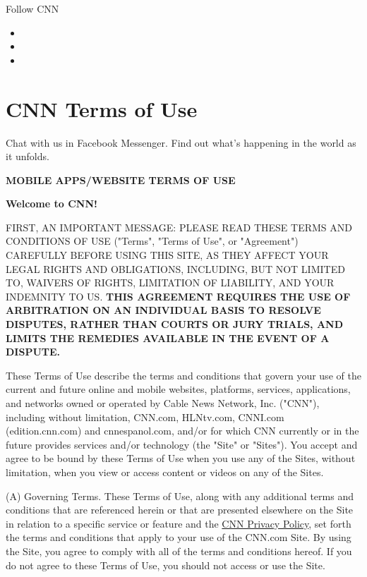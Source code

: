 Follow CNN

\begin{itemize}
\item
\item
\item
\end{itemize}

\hypertarget{cnn-terms-of-use}{%
\section{CNN Terms of Use}\label{cnn-terms-of-use}}

Chat with us in Facebook Messenger. Find out what's happening in the
world as it unfolds.

\textbf{MOBILE APPS/WEBSITE TERMS OF USE}

\textbf{Welcome to CNN!}

FIRST, AN IMPORTANT MESSAGE: PLEASE READ THESE TERMS AND CONDITIONS OF
USE ("Terms", "Terms of Use", or "Agreement") CAREFULLY BEFORE USING
THIS SITE, AS THEY AFFECT YOUR LEGAL RIGHTS AND OBLIGATIONS, INCLUDING,
BUT NOT LIMITED TO, WAIVERS OF RIGHTS, LIMITATION OF LIABILITY, AND YOUR
INDEMNITY TO US. \textbf{THIS AGREEMENT REQUIRES THE USE OF ARBITRATION
ON AN INDIVIDUAL BASIS TO RESOLVE DISPUTES, RATHER THAN COURTS OR JURY
TRIALS, AND LIMITS THE REMEDIES AVAILABLE IN THE EVENT OF A DISPUTE.}

These Terms of Use describe the terms and conditions that govern your
use of the current and future online and mobile websites, platforms,
services, applications, and networks owned or operated by Cable News
Network, Inc. ("CNN"), including without limitation, CNN.com, HLNtv.com,
CNNI.com (edition.cnn.com) and cnnespanol.com, and/or for which CNN
currently or in the future provides services and/or technology (the
"Site" or "Sites"). You accept and agree to be bound by these Terms of
Use when you use any of the Sites, without limitation, when you view or
access content or videos on any of the Sites.

(A) Governing Terms. These Terms of Use, along with any additional terms
and conditions that are referenced herein or that are presented
elsewhere on the Site in relation to a specific service or feature and
the \href{http://www.cnn.com/privacy}{CNN Privacy Policy}, set forth the
terms and conditions that apply to your use of the CNN.com Site. By
using the Site, you agree to comply with all of the terms and conditions
hereof. If you do not agree to these Terms of Use, you should not access
or use the Site.

